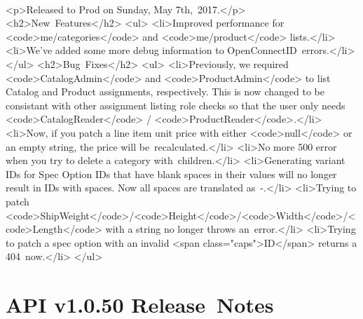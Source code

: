\documentclass{memoir}%
\begin{document}
%
\paragraph*{}%
<p>Released to Prod on Sunday, May 7th,~2017.</p>\newline%
<h2>New~Features</h2>\newline%
<ul>\newline%
<li>Improved performance for <code>me/categories</code> and <code>me/product</code> lists.</li>\newline%
<li>We’ve added some more debug information to OpenConnectID~errors.</li>\newline%
</ul>\newline%
<h2>Bug~Fixes</h2>\newline%
<ul>\newline%
<li>Previously, we required <code>CatalogAdmin</code> and <code>ProductAdmin</code> to list Catalog and Product assignments, respectively. This is now changed to be consistant with other assignment listing role checks so that the user only needs <code>CatalogReader</code> / <code>ProductReader</code>.</li>\newline%
<li>Now, if you patch a line item unit price with either <code>null</code> or an empty string, the price will be~recalculated.</li>\newline%
<li>No more 500 error when you try to delete a category with~children.</li>\newline%
<li>Generating variant IDs for Spec Option IDs that have blank spaces in their values will no longer result in IDs with spaces. Now all spaces are translated as~{-}.</li>\newline%
<li>Trying to patch <code>ShipWeight</code>/<code>Height</code>/<code>Width</code>/<code>Length</code> with a string no longer throws an~error.</li>\newline%
<li>Trying to patch a spec option with an invalid <span class="caps">ID</span> returns a 404~now.</li>\newline%
</ul>

%
\section*{API v1.0.50 Release~Notes}%
\paragraph*{}%

%
\end{document}
